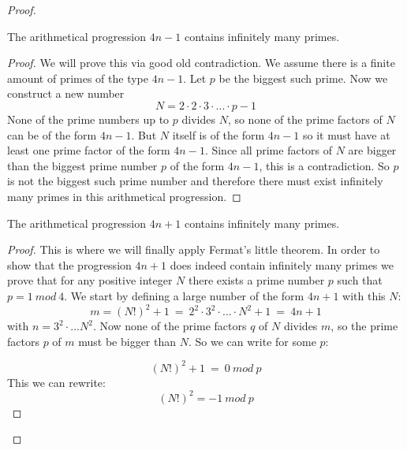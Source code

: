 \documentclass{article}
\theoremstyle{definition}
\begin{document}
\begin{proof}
\begin{theorem}
    The arithmetical progression $4n-1$ contains infinitely many primes.
\end{theorem}

\begin{proof}
    We will prove this via good old contradiction. We assume there is a finite amount of primes of the type $4n-1$. Let $p$ be the biggest such prime. Now we construct a new number
    \begin{equation}
       N=  2\cdot 2 \cdot 3 \cdot ... \cdot p - 1
    \end{equation}
    None of the prime numbers up to $p$ divides $N$, so none of the prime factors of $N$ can be of the form $4n-1$. But $N$ itself is of the form $4n-1$ so it must have at least one prime factor of the form $4n-1$. Since all prime factors of $N$ are bigger than the biggest prime number $p$ of the form $4n-1$, this is a contradiction. So $p$ is not the biggest such prime number and therefore there must exist infinitely many primes in this arithmetical progression.
\end{proof}
\begin{theorem}
    The arithmetical progression $4n+1$ contains infinitely many primes.
\end{theorem}
\begin{proof}
    This is where we will finally apply Fermat's little theorem. In order to show that the progression $4n+1$ does indeed contain infinitely many primes we prove that for any positive integer $N$ there exists a prime number $p$ such that $p=1\: mod \: 4$.
    We start by defining a large number of the form $4n+1$ with this $N$:
    \begin{equation}
        m = (N!)^2 +1 \: =\:  2^2 \cdot 3^2 \cdot ... \cdot N^2 +1 \: = \: 4n+1
    \end{equation}
with $n=3^2\cdot ... N^2$. Now none of the prime factors $q$ of $N$ divides $m$, so the prime factors $p$ of $m$ must be bigger than $N$. So we can write for some $p$:

\begin{equation}
    (N!)^2 +1 \: = \: 0 \: mod \: p
\end{equation}
This we can rewrite:
\begin{equation}
    (N!)^2 = -1 \: mod \: p
\end{equation}


\end{proof}
\end{proof}
\end{document}
